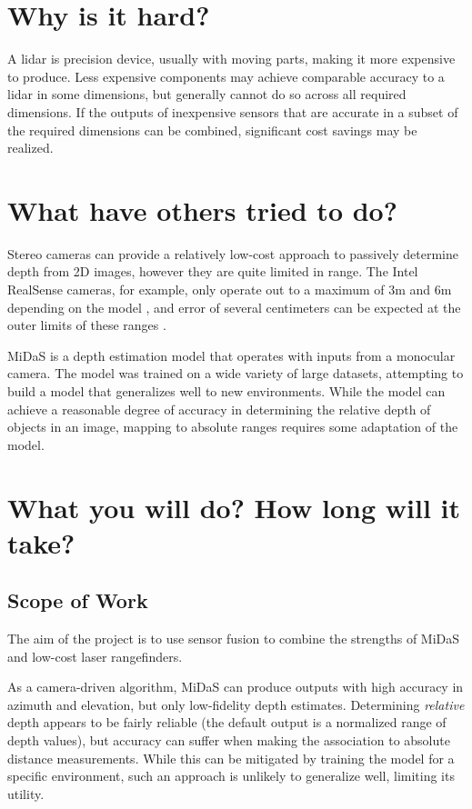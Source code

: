 \documentclass[conference]{IEEEtran}
\begin{document}
\section{Why is it hard?}
A lidar is precision device, usually with moving parts, making it more
expensive to produce. Less expensive components may achieve comparable accuracy
to a lidar in some dimensions, but generally cannot do so across all required
dimensions. If the outputs of inexpensive sensors that are accurate in a subset
of the required dimensions can be combined, significant cost savings may be
realized.

\section{What have others tried to do?}
Stereo cameras can provide a relatively low-cost approach to passively
determine depth from 2D images, however they are quite limited in range. The
Intel RealSense cameras, for example, only operate out to a maximum of 3m and
6m depending on the model \cite{realsense-range}, and error of several
centimeters can be expected at the outer limits of these ranges
\cite{realsense-error}.

MiDaS \cite{midas} \cite{midas-paper} is a depth estimation model that operates
with inputs from a monocular camera. The model was trained on a wide variety of
large datasets, attempting to build a model that generalizes well to new
environments. While the model can achieve a reasonable degree of accuracy in
determining the relative depth of objects in an image, mapping to absolute
ranges requires some adaptation of the model.


\section{What you will do? How long will it take?}
\subsection{Scope of Work}
The aim of the project is to use sensor fusion to combine the strengths of
MiDaS and low-cost laser rangefinders.

As a camera-driven algorithm, MiDaS can produce outputs with high accuracy in
azimuth and elevation, but only low-fidelity depth estimates. Determining
\textit{relative} depth appears to be fairly reliable (the default output is a
normalized range of depth values), but accuracy can suffer when making the
association to absolute distance measurements. While this can be mitigated by
training the model for a specific environment, such an approach is unlikely to
generalize well, limiting its utility.
\end{document}
